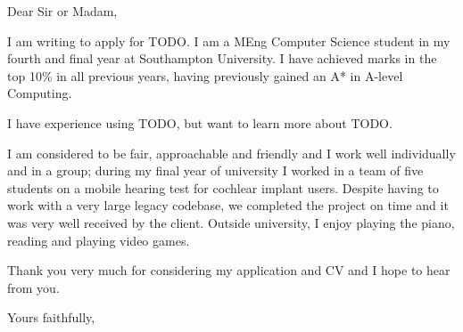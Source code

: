 \documentclass[a4paper, margin=0.3in]{letter}
\begin{document}
\begin{letter}{}

\opening{Dear Sir or Madam,}

I am writing to apply for TODO. I am a MEng Computer Science student in my
fourth and final year at Southampton University. I have achieved marks in the
top 10\% in all previous years, having previously gained an A* in A-level
Computing.

I have experience using TODO, but want to learn more about TODO.

I am considered to be fair, approachable and friendly and I work well
individually and in a group; during my final year of university I worked in a
team of five students on a mobile hearing test for cochlear implant users.
Despite having to work with a very large legacy codebase, we completed the
project on time and it was very well received by the client. Outside
university, I enjoy playing the piano, reading and playing video games.

Thank you very much for considering my application and CV and I hope to hear
from you.

\closing{Yours faithfully,}

\end{letter}
\end{document}
